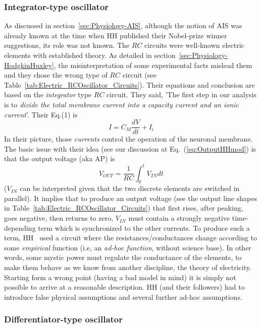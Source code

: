 \subsubsection{Integrator-type oscillator\label{Physics-OscillatorIntegrator}}

 As discussed in section~\ref{sec:Physiology-AIS}, although the notion of 
\gls{AIS}
was already known at the time when HH \cite{HodgkinHuxley:1952}
published their Nobel-prize winner suggestions,
its role was not known. 
The $RC$ circuits were well-known electric elements with established theory. As detailed in section~\ref{sec:Physiology-HodgkinHuxley}, the misinterpretation of some experimental facts mislead them and they
chose the wrong type of $RC$ circuit (see Table~\ref{tab:Electric_RCOscillator_Circuits}). Their equations and conclusion
are based on the \textit{integrator} type $RC$ circuit. They said, 'The first step in our analysis
is to \textit{divide the total membrane current into a capacity current and an ionic current}'.
Their Eq.(1) is
\begin{equation}
	I = C_M \frac{dV}{dt}+I_i \label{eq:OutputHH}
\end{equation}
In their picture, those \textit{currents} control the operation of the neuronal membrane.
The basic issue with their idea (see our discussion at Eq.~(\ref{eq:OutputHHmod}) is that the output voltage (aka
\gls{AP})
is 
%
\[V_{OUT}=\frac{1}{RC}\int_0^t V_{IN} dt\]
%
($V_{IN}$ can be interpreted given that the two discrete elements are switched in parallel). It implies that to produce
an output voltage (see the output line shapes in Table~\ref{tab:Electric_RCOscillator_Circuits}) that first rises, after peaking, goes negative, then returns
to zero, $V_{IN}$ must contain a strongly negative time-depending term which is synchronized to the other currents.
To produce such a term, 
\gls{HH}~\cite{HodgkinHuxley:1952} used a circuit
where the resistances/conductances change according to some \textit{empirical} function
(i.e, an \textit{ad-hoc function}, without science base).
In other words, some mystic power must regulate the conductance of the elements,
to make them behave as we know  from another discipline, the theory of electricity. Starting form a wrong point (having a bad model in mind) it is simply not possible to arrive at a reasonable description. HH (and their followers) had to introduce false physical assumptions and several further ad-hoc assumptions.

\subsubsection{Differentiator-type oscillator\label{Physics-OscillatorDifferentiator}}


